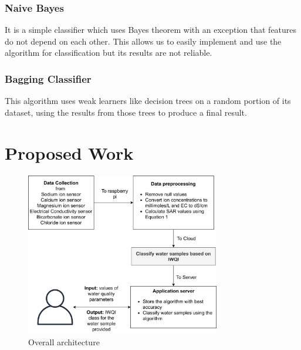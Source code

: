 \documentclass[conference]{IEEEtran}
\begin{document}
\subsubsection{Naive Bayes}
\label{subsubsection:naiveBayes}
It is a simple classifier which uses Bayes theorem with an exception that features do not depend on each other\cite{article:naiveBayes}. This allows us to easily implement and use the algorithm for classification but its results are not reliable.  

\subsubsection{Bagging Classifier}
\label{subsubsection:baggingClassifier}
This algorithm uses weak learners like decision trees on a random portion of its dataset, using the results from those trees to produce a final result\cite{article:baggingClassifier}. 


\section{Proposed Work}
\label{section:materialAndMethods}

\begin{figure}[h!]
\centering
\includegraphics[width=8.5cm]{overallArchitecture.png}
\caption{Overall architecture}
\label{fig:overallArchitecture}
\end{figure}
\end{document}
